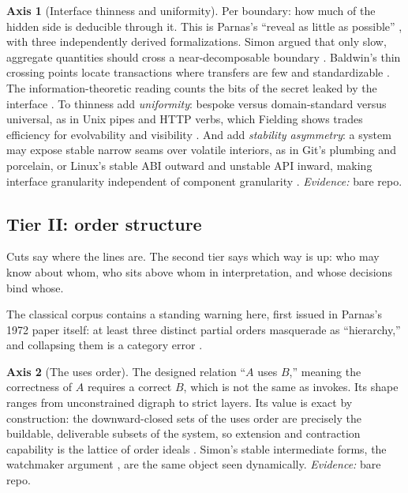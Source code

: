 \documentclass[11pt,oneside]{article}
\theoremstyle{definition}
\newtheorem{axis}{Axis}
\begin{document}
\begin{axis}[Interface thinness and uniformity]\label{ax:interface}
Per boundary: how much of the hidden side is deducible through it. This is Parnas's ``reveal as
little as possible'' \cite{parnas1972}, with three independently derived formalizations. Simon
argued that only slow, aggregate quantities should cross a near-decomposable boundary
\cite{simon1962}. Baldwin's thin crossing points locate transactions where transfers are few and
standardizable \cite{baldwin2008}. The information-theoretic reading counts the bits of the
secret leaked by the interface \cite{allen1999}. To thinness add \emph{uniformity}: bespoke
versus domain-standard versus universal, as in Unix pipes and HTTP verbs, which Fielding shows
trades efficiency for evolvability and visibility \cite{fielding2000}. And add \emph{stability
asymmetry}: a system may expose stable narrow seams over volatile interiors, as in Git's
plumbing and porcelain, or Linux's stable ABI outward and unstable API inward, making interface
granularity independent of component granularity \cite{aosagit}. \emph{Evidence:} bare repo.
\end{axis}

\subsection{Tier II: order structure}\label{sec:orders}

Cuts say where the lines are. The second tier says which way is up: who may know about whom, who
sits above whom in interpretation, and whose decisions bind whose.

The classical corpus contains a standing warning here, first issued in Parnas's 1972 paper
itself: at least three distinct partial orders masquerade as ``hierarchy,'' and collapsing them
is a category error \cite{parnas1972}.

\begin{axis}[The uses order]\label{ax:uses}
The designed relation ``$A$ uses $B$,'' meaning the correctness of $A$ requires a correct $B$,
which is not the same as invokes. Its shape ranges from unconstrained digraph to strict layers.
Its value is exact by construction: the downward-closed sets of the uses order are precisely the
buildable, deliverable subsets of the system, so extension and contraction capability is the
lattice of order ideals \cite{parnas1979}. Simon's stable intermediate forms, the watchmaker
argument \cite{simon1962}, are the same object seen dynamically. \emph{Evidence:} bare repo.
\end{axis}
\end{document}
